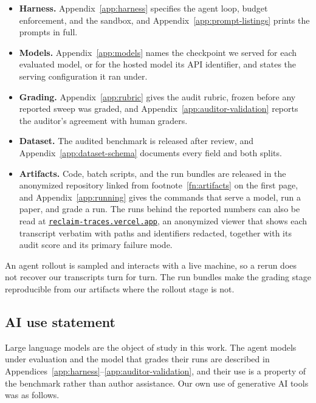 \documentclass{article} %
\begin{document}
\begin{itemize}
\item \textbf{Harness.} Appendix~\ref{app:harness} specifies the agent loop,
budget enforcement, and the sandbox, and Appendix~\ref{app:prompt-listings} prints the prompts in full.
\item \textbf{Models.} Appendix~\ref{app:models} names the checkpoint we served
for each evaluated model, or for the hosted model its API identifier, and
states the serving configuration it ran under.
\item \textbf{Grading.} Appendix~\ref{app:rubric} gives the audit rubric,
frozen before any reported sweep was graded, and
Appendix~\ref{app:auditor-validation} reports the auditor's agreement with
human graders.
\item \textbf{Dataset.} The audited benchmark is released after review, and
Appendix~\ref{app:dataset-schema} documents every field and both splits.
\item \textbf{Artifacts.} Code, batch scripts, and the run bundles
are released in the anonymized repository linked from
footnote~\ref{fn:artifacts} on the first page, and
Appendix~\ref{app:running} gives the commands that serve a model, run a
paper, and grade a run. The runs behind the reported numbers can also be
read at \href{https://reclaim-traces.vercel.app}{\nolinkurl{reclaim-traces.vercel.app}}, an anonymized viewer that
shows each transcript verbatim with paths and identifiers redacted, together
with its audit score and its primary failure mode.
\end{itemize}

An agent rollout is sampled and interacts with a live machine, so a rerun does
not recover our transcripts turn for turn. The run bundles make the
grading stage reproducible from our artifacts where the rollout stage is not.

\subsection*{AI use statement}

Large language models are the object of study in this work. The agent models
under evaluation and the model that grades their runs are described in
Appendices~\ref{app:harness}--\ref{app:auditor-validation}, and their use is a
property of the benchmark rather than author assistance. Our own use of
generative AI tools was as follows.
\end{document}
